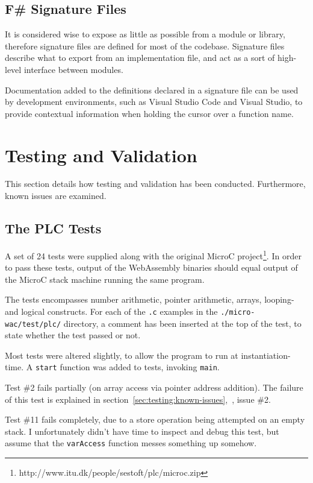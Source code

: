 \documentclass[a4paper]{article}
\begin{document}
\subsection{F\# Signature Files}
It is considered wise to expose as little as possible from a module or library, therefore signature files are defined for most of the codebase. Signature files describe what to export from an implementation file, and act as a sort of high-level interface between modules.

Documentation added to the definitions declared in a signature file can be used by development environments, such as Visual Studio Code and Visual Studio, to provide contextual information when holding the cursor over a function name.

\newpage
\section{Testing and Validation}
\label{sec:testing}
This section details how testing and validation has been conducted. Furthermore, known issues are examined.

\subsection{The PLC Tests}
\label{sec:testing:plc}
A set of 24 tests were supplied along with the original MicroC project\footnote{http://www.itu.dk/people/sestoft/plc/microc.zip}. In order to pass these tests, output of the WebAssembly binaries should equal output of the MicroC stack machine running the same program.

The tests encompasses number arithmetic, pointer arithmetic, arrays, looping- and logical constructs. For each of the \texttt{.c} examples in the \texttt{./micro-wac/test/plc/} directory, a comment has been inserted at the top of the test, to state whether the test passed or not.

Most tests were altered slightly, to allow the program to run at instantiation-time. A \texttt{start} function was added to tests, invoking \texttt{main}.

Test \#2 fails partially (on array access via pointer address addition). The failure of this test is explained in section~\ref{sec:testing:known-issues},~, issue \#2.

Test \#11 fails completely, due to a store operation being attempted on an empty stack. I unfortunately didn't have time to inspect and debug this test, but assume that the \texttt{varAccess} function messes something up somehow.
\end{document}
